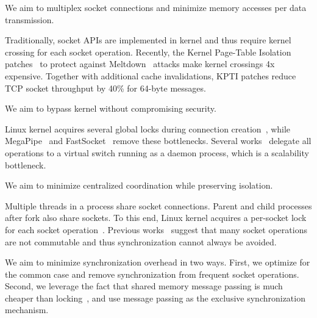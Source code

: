 We aim to multiplex socket connections and minimize memory accesses per data transmission.


Traditionally, socket APIs are implemented in kernel and thus require kernel crossing for each socket operation.
Recently, the Kernel Page-Table Isolation patches~\cite{kpti} to protect against Meltdown~\cite{Lipp2018meltdown} attacks make kernel crossings 4x expensive.
Together with additional cache invalidations, KPTI patches reduce TCP socket throughput by 40\% for 64-byte messages. %

We aim to bypass kernel without compromising security.


Linux kernel acquires several global locks during connection creation~\cite{boyd2010analysis}, while MegaPipe~\cite{han2012megapipe} and FastSocket~\cite{lin2016scalable} remove these bottlenecks.
Several works~\cite{martins2014clickos,roghanchi2017ffwd,huang2017high,freeflow} delegate all operations to a virtual switch running as a daemon process, which is a scalability bottleneck.

We aim to minimize centralized coordination while preserving isolation.

Multiple threads in a process share socket connections.
Parent and child processes after fork also share sockets.
To this end, Linux kernel acquires a per-socket lock for each socket operation~\cite{boyd2010analysis,han2012megapipe,lin2016scalable}.
Previous works~\cite{boyd2010analysis,clements2015scalable} suggest that many socket operations are not commutable and thus synchronization cannot always be avoided.

We aim to minimize synchronization overhead in two ways.
First, we optimize for the common case and remove synchronization from frequent socket operations.
Second, we leverage the fact that shared memory message passing is much cheaper than locking~\cite{roghanchi2017ffwd}, and use message passing as the exclusive synchronization mechanism.


